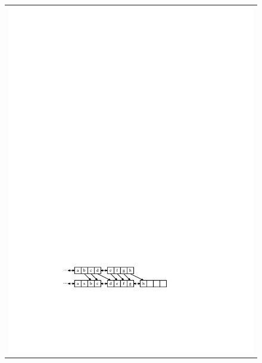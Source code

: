 \begin{figure}
\begin{center}
\begin{tabular}{@{}l@{}}
			\includegraphics[width=\ScaleIfNeeded]{figs/selist-add-b}\\[4ex]

\end{tabular}
\end{center}
\end{figure}
